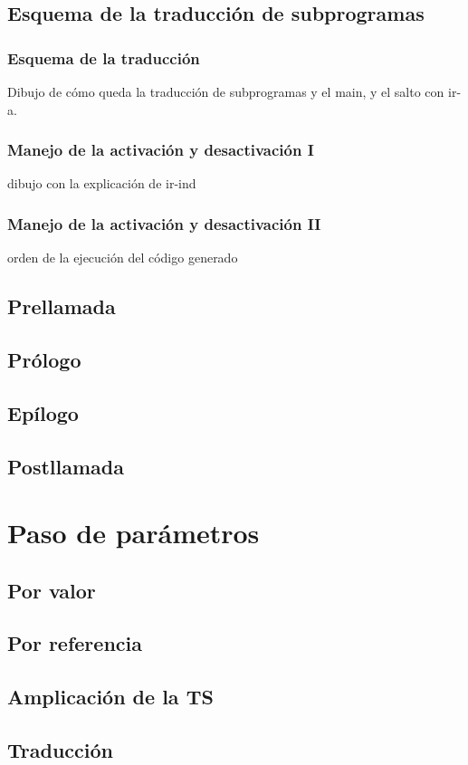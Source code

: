 \documentclass[hyperref={pdfpagelabels=false},tree-dvips]{beamer}
\begin{document}
\subsection{Esquema de la traducción de subprogramas}
\begin{frame}[fragile]
\frametitle{Esquema de la traducción}

Dibujo de cómo queda la traducción de subprogramas y el main, y el salto con ir-a.

\end{frame}
\begin{frame}[fragile]
\frametitle{Manejo de la activación y desactivación I}

dibujo con la explicación de ir-ind

\end{frame}
\begin{frame}[fragile]
\frametitle{Manejo de la activación y desactivación II}

orden de la ejecución del código generado

\end{frame}

\subsection{Prellamada}
\subsection{Prólogo}
\subsection{Epílogo}
\subsection{Postllamada}


\section{Paso de parámetros}
\subsection{Por valor}
\subsection{Por referencia}
\subsection{Amplicación de la TS}
\subsection{Traducción}



\end{document}
